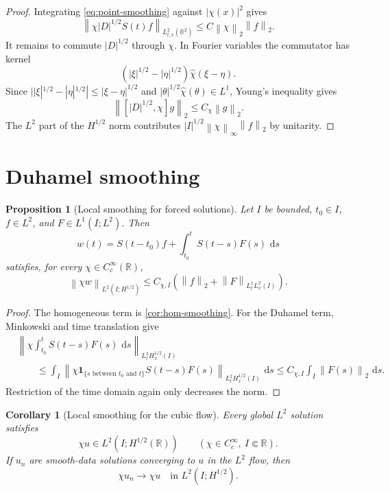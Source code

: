 \documentclass[11pt,oneside]{book}
\newtheorem{proposition}[theorem]{Proposition}
\newtheorem{corollary}[theorem]{Corollary}
\theoremstyle{definition}
\theoremstyle{remark}
\newcommand{\R}{\mathbb R}
\newcommand{\1}{\mathbf 1}
\newcommand{\dd}{\,\mathrm d}
\newcommand{\norm}[1]{\left\lVert #1\right\rVert}
\begin{document}
\begin{proof}
Integrating \eqref{eq:point-smoothing} against $|\chi(x)|^2$ gives
\[
 \norm{\chi|D|^{1/2}S(t)f}_{L^2_{t,x}(\R^2)}
 \le C\norm\chi_2\norm f_2.
\]
It remains to commute $|D|^{1/2}$ through $\chi$.  In Fourier variables the
commutator has kernel
\[
 (|\xi|^{1/2}-|\eta|^{1/2})\widehat\chi(\xi-\eta).
\]
Since $||\xi|^{1/2}-|\eta|^{1/2}|\le|\xi-\eta|^{1/2}$ and
$|\theta|^{1/2}\widehat\chi(\theta)\in L^1$, Young's inequality gives
\[
 \norm{[|D|^{1/2},\chi]g}_2\le C_\chi\norm g_2.
\]
The $L^2$ part of the $H^{1/2}$ norm contributes
$|I|^{1/2}\norm\chi_\infty\norm f_2$ by unitarity.
\end{proof}

\section{Duhamel smoothing}

\begin{proposition}[Local smoothing for forced solutions]\label{prop:forced-smoothing}
Let $I$ be bounded, $t_0\in I$, $f\in L^2$, and
$F\in L^1(I;L^2)$.  Then
\[
 w(t)=S(t-t_0)f+\int_{t_0}^tS(t-s)F(s)\,\dd s
\]
satisfies, for every $\chi\in C_c^\infty(\R)$,
\begin{equation}
 \norm{\chi w}_{L^2(I;H^{1/2})}
 \le C_{\chi,I}\left(\norm f_2+\norm F_{L^1_tL^2_x(I)}\right). \label{eq:forced-smoothing}
\end{equation}
\end{proposition}

\begin{proof}
The homogeneous term is \cref{cor:hom-smoothing}.  For the Duhamel term,
Minkowski and time translation give
\begin{align*}
 &\left\|\chi\int_{t_0}^tS(t-s)F(s)\,\dd s\right\|_{L^2_tH^{1/2}_x(I)}\\
 &\qquad\le\int_I
 \norm{\chi\1_{\{s\text{ between }t_0\text{ and }t\}}
       S(t-s)F(s)}_{L^2_tH^{1/2}_x(I)}\,\dd s
 \le C_{\chi,I}\int_I\norm{F(s)}_2\,\dd s.
\end{align*}
Restriction of the time domain again only decreases the norm.
\end{proof}

\begin{corollary}[Local smoothing for the cubic flow]\label{cor:NLS-smoothing}
Every global $L^2$ solution satisfies
\begin{equation}
  \chi u\in L^2(I;H^{1/2}(\R))
  \qquad(\chi\in C_c^\infty,\ I\Subset\R).          \label{eq:NLS-local-smoothing}
\end{equation}
If $u_n$ are smooth-data solutions converging to $u$ in the $L^2$ flow, then
\begin{equation}
  \chi u_n\to\chi u
  \quad\text{in }L^2(I;H^{1/2}).                   \label{eq:smoothing-convergence}
\end{equation}
\end{corollary}
\end{document}
